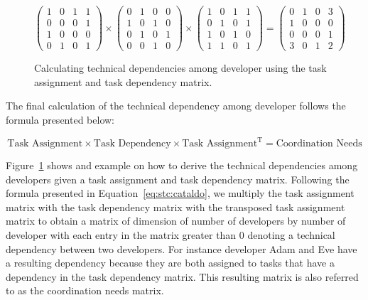\begin{figure}[ht]
\centering
\[
\left(
\begin{matrix}
1 & 0 & 1 & 1\\
0 & 0 & 0 & 1\\
1 & 0 & 0 & 0\\
0 & 1 & 0 & 1
\end{matrix}
\right)
\times
\left(
\begin{matrix}
0 & 1 & 0 & 0\\
1 & 0 & 1 & 0\\
0 & 1 & 0 & 1\\
0 & 0 & 1 & 0
\end{matrix}
\right)
\times
\left(
\begin{matrix}
1 & 0 & 1 & 1\\
0 & 1 & 0 & 1\\
1 & 0 & 1 & 0\\
1 & 1 & 0 & 1
\end{matrix}
\right)
=
\left(
\begin{matrix}
0 & 1 & 0 & 3\\
1 & 0 & 0 & 0\\
0 & 0 & 0 & 1\\
3 & 0 & 1 & 2
\end{matrix}
\right)
\]
\caption{Calculating technical dependencies among developer using the task assignment and task dependency matrix.}
\label{chap:3:fig:example:stc:cataldo}
\end{figure}
The final calculation of the technical dependency among developer follows the formula presented below:

\begin{equation}
\label{eq:stc:cataldo}
\text{Task Assignment} \times \text{Task Dependency} \times \text{Task Assignment}^{\text{T}} = \text{Coordination Needs}
\end{equation}

Figure~\ref{chap:3:fig:example:stc:cataldo} shows and example on how to derive the technical dependencies among developers given a task assignment and task dependency matrix.
Following the formula presented in Equation~\ref{eq:stc:cataldo}, we multiply the task assignment matrix with the task dependency matrix with the transposed task assignment matrix to obtain a matrix of dimension of number of developers by number of developer with each entry in the matrix greater than 0 denoting a technical dependency between two developers.
For instance developer Adam and Eve have a resulting dependency because they are both assigned to tasks that have a dependency in the task dependency matrix. 
This resulting matrix is also referred to as the coordination needs matrix.

